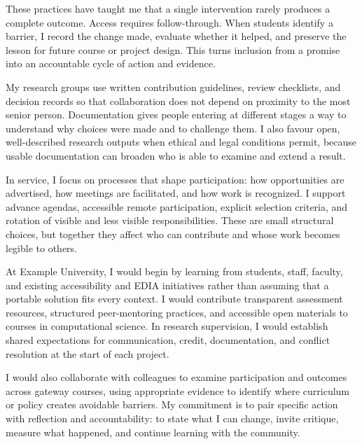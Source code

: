 \documentclass[type=diversity]{careerdossier-statement}
\begin{document}
These practices have taught me that a single intervention rarely produces a
complete outcome. Access requires follow-through. When students identify a
barrier, I record the change made, evaluate whether it helped, and preserve the
lesson for future course or project design. This turns inclusion from a promise
into an accountable cycle of action and evidence.


My research groups use written contribution guidelines, review checklists, and
decision records so that collaboration does not depend on proximity to the most
senior person. Documentation gives people entering at different stages a way to
understand why choices were made and to challenge them. I also favour open,
well-described research outputs when ethical and legal conditions permit,
because usable documentation can broaden who is able to examine and extend a
result.

In service, I focus on processes that shape participation: how opportunities
are advertised, how meetings are facilitated, and how work is recognized. I
support advance agendas, accessible remote participation, explicit selection
criteria, and rotation of visible and less visible responsibilities. These are
small structural choices, but together they affect who can contribute and whose
work becomes legible to others.


At Example University, I would begin by learning from students, staff, faculty,
and existing accessibility and EDIA initiatives rather than assuming that a
portable solution fits every context. I would contribute transparent assessment
resources, structured peer-mentoring practices, and accessible open materials
to courses in computational science. In research supervision, I would establish
shared expectations for communication, credit, documentation, and conflict
resolution at the start of each project.

I would also collaborate with colleagues to examine participation and outcomes
across gateway courses, using appropriate evidence to identify where curriculum
or policy creates avoidable barriers. My commitment is to pair specific action
with reflection and accountability: to state what I can change, invite critique,
measure what happened, and continue learning with the community.
\end{document}
